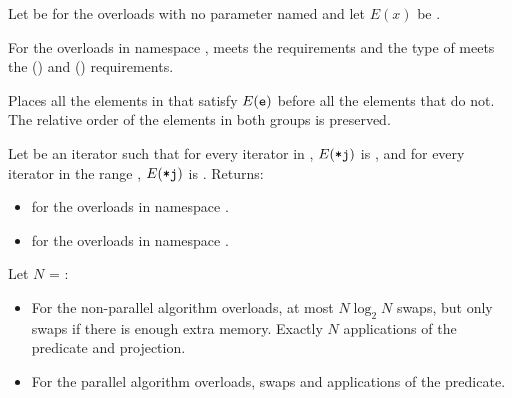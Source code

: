 \begin{itemdescr}
\pnum
Let  be 
for the overloads with no parameter named 
and let $E(x)$ be .

\pnum
\expects
For the overloads in namespace ,
 meets
the  requirements and
the type of  meets
the  () and
 () requirements.

\pnum
\effects
Places all the elements  in 
that satisfy $E(\tcode{e})$ before all the elements that do not.
The relative order of the elements in both groups is preserved.

\pnum
\returns
Let  be an iterator
such that for every iterator  in ,
$E(\tcode{*j})$ is ,
and for every iterator  in the range ,
$E(\tcode{*j})$ is .
Returns:
\begin{itemize}
\item {} for the overloads in namespace .
\item {} for the overloads in namespace .
\end{itemize}

\pnum
\complexity
Let $N$ = :
\begin{itemize}
\item
  For the non-parallel algorithm overloads,
  at most $N \log_2 N$ swaps,
  but only  swaps if there is enough extra memory.
  Exactly $N$ applications of the predicate and projection.
\item
  For the parallel algorithm overloads,
   swaps and  applications of the predicate.
\end{itemize}
\end{itemdescr}

